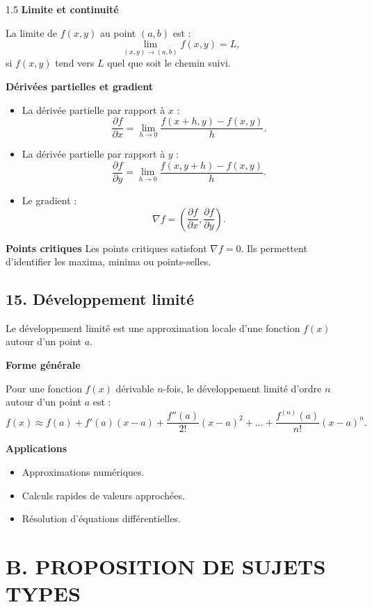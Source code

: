 \documentclass[12pt]{article}
\begin{document}
\begin{spacing}{1.5}
\textbf{Limite et continuité}

La limite de \( f(x, y) \) au point \( (a, b) \) est :  
\[ \lim_{(x, y) \to (a, b)} f(x, y) = L, \]
si \( f(x, y) \) tend vers \( L \) quel que soit le chemin suivi.

\textbf{Dérivées partielles et gradient}

\begin{itemize}
    \item La dérivée partielle par rapport à \( x \) :  
    \[ \frac{\partial f}{\partial x} = \lim_{h \to 0} \frac{f(x+h, y) - f(x, y)}{h}. \]
    \item La dérivée partielle par rapport à \( y \) :  
    \[ \frac{\partial f}{\partial y} = \lim_{h \to 0} \frac{f(x, y+h) - f(x, y)}{h}. \]
    \item Le gradient :  
    \[ \nabla f = \left( \frac{\partial f}{\partial x}, \frac{\partial f}{\partial y} \right). \]
\end{itemize}

\textbf{Points critiques}
Les points critiques satisfont \( \nabla f = 0 \). Ils permettent d'identifier les maxima, minima ou points-selles.

\subsection*{15. Développement limité}
Le développement limité est une approximation locale d'une fonction \( f(x) \) autour d'un point \( a \).

\textbf{Forme générale}

Pour une fonction \( f(x) \) dérivable \( n \)-fois, le développement limité d'ordre \( n \) autour d'un point \( a \) est :  
\[ f(x) \approx f(a) + f'(a)(x-a) + \frac{f''(a)}{2!}(x-a)^2 + \dots + \frac{f^{(n)}(a)}{n!}(x-a)^n. \]

\textbf{Applications}

\begin{itemize}
    \item Approximations numériques.  
    \item Calculs rapides de valeurs approchées.  
    \item Résolution d'équations différentielles.
\end{itemize}




\newpage

\section*{\textbf{B. PROPOSITION DE SUJETS TYPES}}



\end{spacing}
\end{document}
